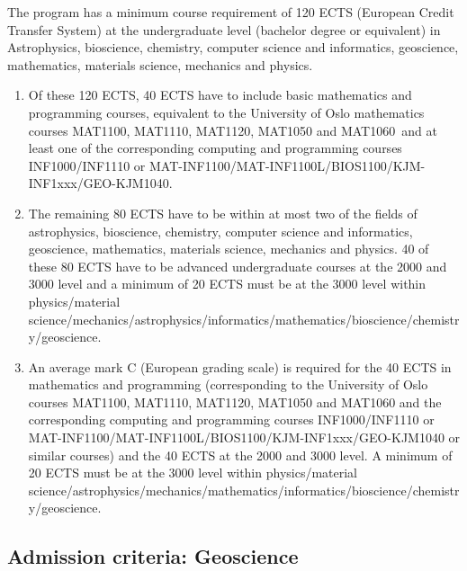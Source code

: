 \documentclass[%
oneside,                 %
final,                   %
10pt]{article}
\begin{document}
The program has a minimum course requirement of 120 ECTS (European Credit Transfer System) at the undergraduate level (bachelor degree or equivalent) in Astrophysics, bioscience, chemistry, computer science and informatics, geoscience, mathematics, materials science, mechanics and physics. 
\begin{enumerate}
\item Of these 120 ECTS, 40 ECTS have to include basic mathematics and programming courses, equivalent to the University of Oslo mathematics courses MAT1100, MAT1110, MAT1120, MAT1050 and MAT1060 and at least one of the corresponding computing and programming courses INF1000/INF1110 or MAT-INF1100/MAT-INF1100L/BIOS1100/KJM-INF1xxx/GEO-KJM1040. 

\item The remaining 80 ECTS have to be within at most two of the fields of astrophysics, bioscience, chemistry, computer science and informatics, geoscience, mathematics, materials science, mechanics and physics. 40 of these 80 ECTS have to be advanced undergraduate courses at the 2000 and 3000 level and a minimum of 20 ECTS must be at the 3000 level within physics/material science/mechanics/astrophysics/informatics/mathematics/bioscience/chemistry/geoscience.

\item An average mark C (European grading scale) is required for the 40 ECTS in mathematics and programming (corresponding  to the University of Oslo courses  MAT1100, MAT1110, MAT1120, MAT1050 and MAT1060  and the corresponding computing and programming courses INF1000/INF1110 or MAT-INF1100/MAT-INF1100L/BIOS1100/KJM-INF1xxx/GEO-KJM1040 or similar courses) and the 40 ECTS at the 2000 and 3000 level. A minimum of 20 ECTS must be at the 3000 level within physics/material science/astrophysics/mechanics/mathematics/informatics/bioscience/chemistry/geoscience.
\end{enumerate}

\noindent
\subsection*{Admission criteria: Geoscience}
\end{document}
